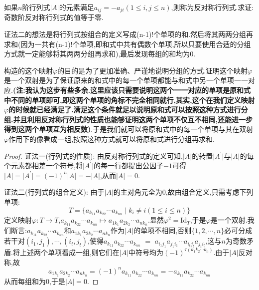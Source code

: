 \documentclass[../../main.tex]{subfiles}%
\begin{document}
\begin{proposition}[奇数阶反对称行列式的值等于零]\label{proposition:奇数阶反对称行列式的值等于零}
如果\(n\)阶行列式\(\vert A\vert\)的元素满足\(a_{ij}=-a_{ji}(1\leqslant  i,j\leqslant  n)\),则称为反对称行列式.求证:奇数阶反对称行列式的值等于零.
\end{proposition}
\begin{note}
{\color{blue}证法二}的想法是将行列式按组合的定义写成(n-1)!个单项的和.然后将其两两分组再求和(因为一共有(n-1)!个单项,即和式中共有偶数个单项,所以只要使用合适的分组方式就一定能够将其两两分组再求和),最后发现每组的和均为0.

构造的这个映射$\varphi$的目的是为了更加准确、严谨地说明分组的方式.证明这个映射$\varphi$是一个双射是为了保证原来的和式中的每一个单项都能与和式中另一个单项一一对应.\textbf{(注:我认为这步有些多余.这里应该只需要说明这两个一一对应的单项是原和式中不同的单项即可,即这两个单项的角标不完全相同就行,其实,这个在我们定义映射$\varphi$的时候就已经满足了.满足这个条件就足以说明原和式可以按照这种方式进行分组.并且利用反对称行列式的性质也能够证明这两个单项不仅互不相同,还能进一步得到这两个单项互为相反数)}.于是我们就可以将原和式中的每一个单项与其在双射$\varphi$作用下的像看成一组,按照这种方式就可以将原和式进行分组再求和.
\end{note}
\begin{proof}

{\color{blue}证法一(行列式的性质):}
由反对称行列式的定义可知,\(\vert A\vert\)的转置\(\vert A^{\prime}\vert\)与\(\vert A\vert\)的每个元素都相差一个符号,将\(\vert A^{\prime}\vert\)的每一行都提出公因子\(-1\)可得\(\vert A\vert=\vert A^{\prime}\vert=(-1)^{n}\vert A\vert=-\vert A\vert\),从而\(\vert A\vert = 0\).

{\color{blue}证法二(行列式的组合定义):}
由于\(\vert A\vert\)的主对角元全为0,故由组合定义,只需考虑下列单项:
\[
T = \{a_{k_11}a_{k_22}\cdots a_{k_{nn}} \mid k_i\neq i(1\leqslant  i\leqslant  n)\}
\]
定义映射\(\varphi:T\to T\),\(a_{k_11}a_{k_22}\cdots a_{k_{nn}}\mapsto a_{1k_1}a_{2k_2}\cdots a_{nk_n}\).显然\(\varphi^2 = \text{Id}_T\),于是\(\varphi\)是一个双射.我们断言:\(a_{k_11}a_{k_22}\cdots a_{k_{nn}}\)和\(a_{1k_1}a_{2k_2}\cdots a_{nk_n}\)作为\(\vert A\vert\)的单项不相同,否则\(\{1,2,\cdots,n\}\)必可分成若干对\((i_1,j_1),\cdots,(i_t,j_t)\),使得$a_{k_11}$$a_{k_22}$$\cdots $$a_{k_{nn}}$ $=$ $a_{i_1j_1}$$a_{j_1i_1}$$\cdots$$ a_{i_tj_t}$$a_{j_ti_t}$,这与\(n\)为奇数矛盾.将上述两个单项看成一组,则它们在\(\vert A\vert\)中符号均为\((-1)^{\tau(k_1k_2\cdots k_n)}\).由于\(\vert A\vert\)反对称,故
\[
a_{1k_1}a_{2k_2}\cdots a_{nk_n}=(-1)^n a_{k_11}a_{k_22}\cdots a_{k_{nn}}=-a_{k_11}a_{k_22}\cdots a_{k_{nn}}
\]
从而每组和为0,于是\(\vert A\vert = 0\).

\end{proof}
\end{document}
